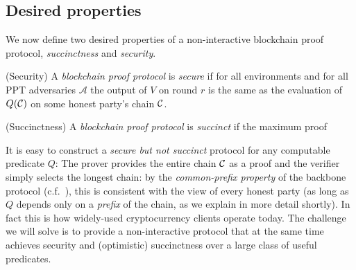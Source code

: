 \subsection{Desired properties}

We now define two desired properties of a non-interactive blockchain proof
protocol, \emph{succinctness} and \emph{security}.

\begin{definition}{(Security)}
A \emph{blockchain proof protocol} is \emph{secure} if for all environments
and for all PPT adversaries $\mathcal{A}$ the output of $V$ on round $r$ is the
same as the evaluation of $Q(\mathcal{C})$ on some honest party's chain $\mathcal{C}$.
\end{definition}

\begin{definition}{(Succinctness)}
A \emph{blockchain proof protocol} is \textit{succinct} if the maximum proof
\end{definition}

It is easy to construct a \emph{secure but not succinct} protocol for any
computable predicate $Q$: The prover provides the entire chain $\mathcal{C}$ as a proof and the
verifier simply selects the longest chain:
by the \emph{common-prefix property} of the backbone protocol (c.f.~\cite{backbone}), this is consistent with
the view of every honest party (as long as $Q$ depends only on a \emph{prefix} of the chain, as we explain in more detail shortly). In fact this is how widely-used cryptocurrency clients operate today.
The challenge we will solve is to provide a non-interactive protocol that at the
same time achieves security and (optimistic) succinctness over a large class of
useful predicates.

